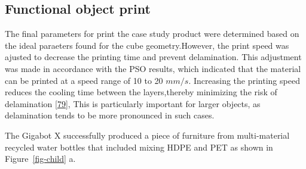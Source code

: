 \documentclass[
]{article}
\begin{document}
\hypertarget{functional-object-print}{%
\subsection{Functional object print}\label{functional-object-print}}

The final parameters for print the case study product were determined
based on the ideal paraeters found for the cube geometry.However, the
print speed was ajusted to decrease the printing time and prevent
delamination. This adjustment was made in accordance with the PSO
results, which indicated that the material can be printed at a speed
range of 10 to 20 \(mm/s\). Increasing the printing speed reduces the
cooling time between the layers,thereby minimizing the risk of
delamination \protect\hyperlink{ref-roschli2019}{{[}79{]}}, This is
particularly important for larger objects, as delamination tends to be
more pronounced in such cases.

The Gigabot X successfully produced a piece of furniture from
multi-material recycled water bottles that included mixing HDPE and PET
as shown in Figure~\ref{fig-child} a.
\end{document}
